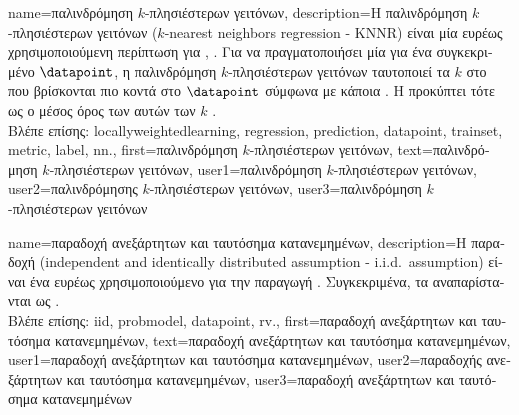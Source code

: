 {name={\foreignlanguage{greek}{παλινδρόμηση $k$-πλησιέστερων γειτόνων}},
	description={\foreignlanguage{greek}{Η παλινδρόμηση $k$-πλησιέστερων 
		γειτόνων} ($k$-nearest neighbors regression - KNNR) 
		\foreignlanguage{greek}{είναι μία ευρέως χρησιμοποιούμενη περίπτωση}  
		\foreignlanguage{greek}{για}  \cite{MLBasics}, \cite{BishopBook}. 
		\foreignlanguage{greek}{Για να πραγματοποιήσει μία}  \foreignlanguage{greek}{για ένα συγκεκριμένο}  
		 $\datapoint$, \foreignlanguage{greek}{η παλινδρόμηση $k$-πλησιέστερων γειτόνων ταυτοποιεί τα} 
		$k$  \foreignlanguage{greek}{στο}  \foreignlanguage{greek}{που βρίσκονται πιο κοντά 
		στο $\datapoint$ σύμφωνα με κάποια} . \foreignlanguage{greek}{Η}  
		\foreignlanguage{greek}{προκύπτει τότε ως ο μέσος όρος των} 
		 \foreignlanguage{greek}{αυτών των} $k$ . 
				\\
		\foreignlanguage{greek}{Βλέπε επίσης:} \gls{locallyweightedlearning}, \gls{regression}, \gls{prediction}, \gls{datapoint}, \gls{trainset}, 
		\gls{metric}, \gls{label}, \gls{nn}.}, 
	first={\foreignlanguage{greek}{παλινδρόμηση $k$-πλησιέστερων γειτόνων}},
	text={\foreignlanguage{greek}{παλινδρόμηση $k$-πλησιέστερων γειτόνων}},
	user1={\foreignlanguage{greek}{παλινδρόμηση $k$-πλησιέστερων γειτόνων}}, %
	user2={\foreignlanguage{greek}{παλινδρόμησης $k$-πλησιέστερων γειτόνων}}, %
	user3={\foreignlanguage{greek}{παλινδρόμηση $k$-πλησιέστερων γειτόνων}} %
}

{name={\foreignlanguage{greek}{παραδοχή ανεξάρτητων και ταυτόσημα κατανεμημένων}}, 
	description={\foreignlanguage{greek}{Η παραδοχή} 
		(independent and identically distributed assumption - i.i.d.\ assumption) \foreignlanguage{greek}{είναι ένα 
		ευρέως χρησιμοποιούμενο}  \foreignlanguage{greek}{για την παραγωγή}
		. \foreignlanguage{greek}{Συγκεκριμένα, τα}  
		\foreignlanguage{greek}{αναπαρίστανται ως}  .
		\\ 
		\foreignlanguage{greek}{Βλέπε επίσης:} \gls{iid}, \gls{probmodel}, \gls{datapoint}, \gls{rv}.},
	first={\foreignlanguage{greek}{παραδοχή ανεξάρτητων και ταυτόσημα κατανεμημένων}},
	text={\foreignlanguage{greek}{παραδοχή ανεξάρτητων και ταυτόσημα κατανεμημένων}},
	user1={\foreignlanguage{greek}{παραδοχή ανεξάρτητων και ταυτόσημα κατανεμημένων}}, %
  	user2={\foreignlanguage{greek}{παραδοχής ανεξάρτητων και ταυτόσημα κατανεμημένων}}, %
	user3={\foreignlanguage{greek}{παραδοχή ανεξάρτητων και ταυτόσημα κατανεμημένων}} %
}%

